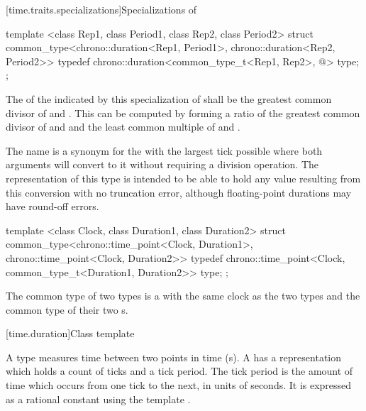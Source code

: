 [time.traits.specializations]{Specializations of }

%
\begin{itemdecl}
template <class Rep1, class Period1, class Rep2, class Period2>
struct common_type<chrono::duration<Rep1, Period1>, chrono::duration<Rep2, Period2>> {
  typedef chrono::duration<common_type_t<Rep1, Rep2>, @\seebelow@> type;
};
\end{itemdecl}

\pnum
The  of the  indicated by this specialization of
 shall be the greatest common divisor of  and
. \enternote This can be computed by forming a ratio of the
greatest common divisor of  and  and the
least common multiple of  and .
\exitnote

\pnum
\enternote The  name  is a synonym for the
 with the largest tick  possible where both
 arguments will convert to it without requiring a division
operation. The representation of this type is intended to be able to hold any
value resulting from this conversion with no truncation error, although
floating-point durations may have round-off errors. \exitnote

%
\begin{itemdecl}
template <class Clock, class Duration1, class Duration2>
struct common_type<chrono::time_point<Clock, Duration1>, chrono::time_point<Clock, Duration2>> {
  typedef chrono::time_point<Clock, common_type_t<Duration1, Duration2>> type;
};
\end{itemdecl}

\pnum
The common type of two  types is a  with the same
clock as the two types and the common type of their two s.

[time.duration]{Class template }

\pnum
A  type measures time between two points in time (s).
A  has a representation which holds a count of ticks and a tick period.
The tick period is the amount of time which occurs from one tick to the next, in units
of seconds. It is expressed as a rational constant using the template .

